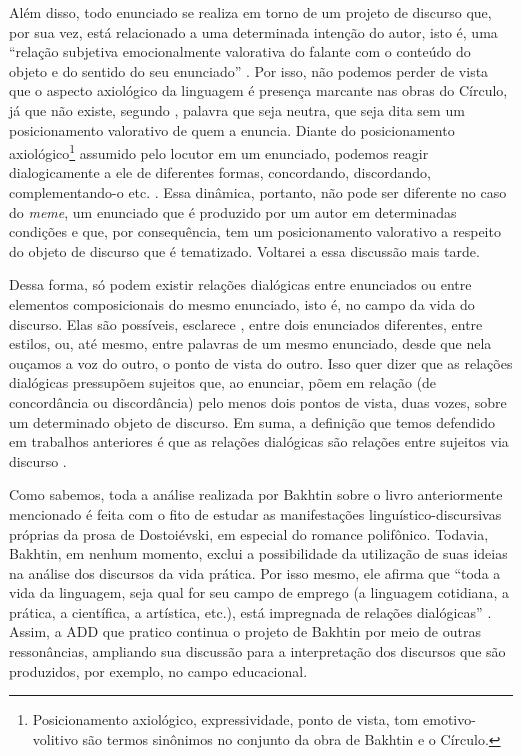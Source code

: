 \documentclass[portuguese]{textolivre}
\begin{document}
Além disso, todo enunciado se realiza em torno de um projeto de discurso que, por sua vez, está relacionado a uma determinada intenção do autor, isto é, uma “relação subjetiva emocionalmente valorativa do falante com o conteúdo do objeto e do sentido do seu enunciado” \cite[p.~47]{bakhtin2016generos}. Por isso, não podemos perder de vista que o aspecto axiológico da linguagem é presença marcante nas obras do Círculo, já que não existe, segundo \textcite{bakhtin2016generos}, palavra que seja neutra, que seja dita sem um posicionamento valorativo de quem a enuncia. Diante do posicionamento axiológico\footnote{Posicionamento axiológico, expressividade, ponto de vista, tom emotivo-volitivo são termos sinônimos no conjunto da obra de Bakhtin e o Círculo.} assumido pelo locutor em um enunciado, podemos reagir dialogicamente a ele de diferentes formas, concordando, discordando, complementando-o etc. \textcite{bakhtin2018problemas}. Essa dinâmica, portanto, não pode ser diferente no caso do \textit{meme}, um enunciado que é produzido por um autor em determinadas condições e que, por consequência, tem um posicionamento valorativo a respeito do objeto de discurso que é tematizado. Voltarei a essa discussão mais tarde.
	
Dessa forma, só podem existir relações dialógicas entre enunciados ou entre elementos composicionais do mesmo enunciado, isto é, no campo da vida do discurso. Elas são possíveis, esclarece \textcite{bakhtin2018problemas}, entre dois enunciados diferentes, entre estilos, ou, até mesmo, entre palavras de um mesmo enunciado, desde que nela ouçamos a voz do outro, o ponto de vista do outro. Isso quer dizer que as relações dialógicas pressupõem sujeitos que, ao enunciar, põem em relação (de concordância ou discordância) pelo menos dois pontos de vista, duas vozes, sobre um determinado objeto de discurso. Em suma, a definição que temos defendido em trabalhos anteriores é que as relações dialógicas são relações entre sujeitos via discurso \cite{maciel2017indistincao, bastos2022disputas}.
	
Como sabemos, toda a análise realizada por Bakhtin sobre o livro anteriormente mencionado é feita com o fito de estudar as manifestações linguístico-discursivas próprias da prosa de Dostoiévski, em especial do romance polifônico. Todavia, Bakhtin, em nenhum momento, exclui a possibilidade da utilização de suas ideias na análise dos discursos da vida prática. Por isso mesmo, ele afirma que “toda a vida da linguagem, seja qual for seu campo de emprego (a linguagem cotidiana, a prática, a científica, a artística, etc.), está impregnada de relações dialógicas” \cite[p.~209]{bakhtin2018problemas}. Assim, a ADD que pratico continua o projeto de Bakhtin por meio de outras ressonâncias, ampliando sua discussão para a interpretação dos discursos que são produzidos, por exemplo, no campo educacional.
	
\end{document}
